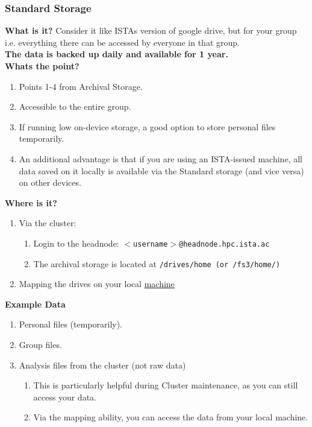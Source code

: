 \documentclass{article}
\begin{document}
\subsubsection{Standard Storage}
\textbf{What is it?}
\newline
Consider it like ISTAs version of google drive, but for your group i.e. everything there can be accessed by everyone in that group.
\\
\textbf{The data is backed up daily and available for 1 year.}
\\

\noindent
\textbf{Whats the point?}
\newline
\begin{enumerate}
    \item Points 1-4 from Archival Storage.
    \item Accessible to the entire group.
    \item If running low on-device storage, a good option to store personal files temporarily. 
    \item An additional advantage is that if you are using an ISTA-issued machine, all data saved on it locally is available via the Standard storage (and vice versa) on other devices.
\end{enumerate}

\noindent
\textbf{Where is it?}
\newline
\begin{enumerate}
    \item Via the cluster: 
    \begin{enumerate}
        \item Login to the headnode: \texttt{$<$username$>$@headnode.hpc.ista.ac}
        \item The archival storage is located at \texttt{/drives/home (or /fs3/home/)}
    \end{enumerate}
    \item Mapping the drives on your local \href{https://it.pages.ist.ac.at/docs/it-documentation/fileservers/fileshare/}{machine}
\end{enumerate}

\noindent
\textbf{Example Data}
\begin{enumerate}
    \item Personal files (temporarily).
    \item Group files.
    \item Analysis files from the cluster (not raw data)
    \begin{enumerate}
        \item This is particularly helpful during Cluster maintenance, as you can still access your data.
        \item Via the mapping ability, you can access the data from your local machine.
    \end{enumerate}

\end{enumerate}
\end{document}
